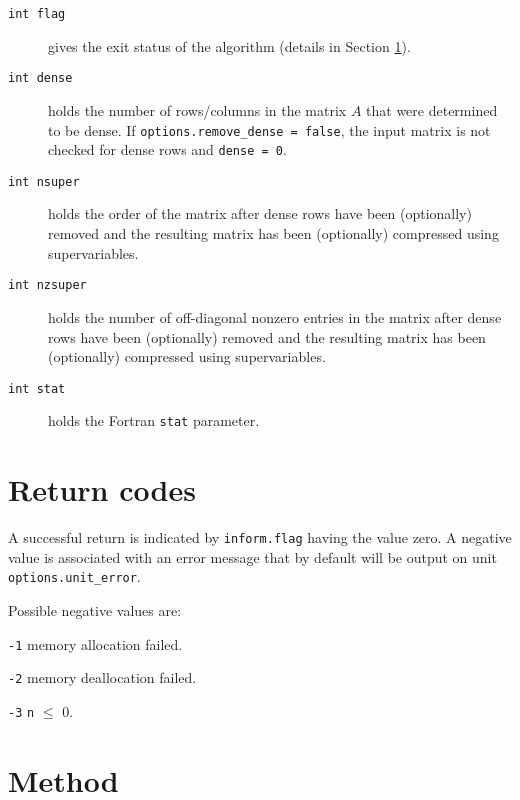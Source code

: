 \begin{description}

\item[\texttt{int flag}]
gives the exit status of the algorithm (details in Section \ref{nd:errors}).

\item[\texttt{int dense}] holds 
the number of rows/columns in the matrix $A$ that were determined to be dense. 
If {\tt options.remove\_dense = false}, the input matrix is not checked for 
dense rows and {\tt dense = 0}.

\item[\texttt{int nsuper}] holds the order 
of the matrix after dense rows have been (optionally) removed and 
the resulting matrix has been (optionally) compressed using supervariables. 

\item[\texttt{int nzsuper}] holds the number of 
off-diagonal nonzero entries in the matrix after dense rows have been 
(optionally) removed and the resulting matrix has been (optionally) compressed 
using supervariables. 

\item[\texttt{int stat}] holds the Fortran {\tt stat} parameter. 

\end{description}



\section{Return codes} \label{nd:errors}

A successful return is indicated by
{\tt inform.flag} having the value zero.
A negative value is associated with an error message that by default will
be output on unit {\tt options.unit\_error}.

Possible negative values are:

\begin{description}

\item{} {\tt -1} memory allocation failed.
\item{} {\tt -2} memory deallocation failed.
\item{} {\tt -3} {\tt n} $\le$ 0.
\end{description}


\section{Method} \label{method}

